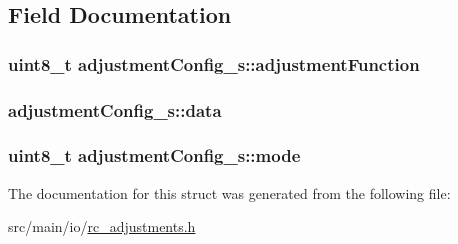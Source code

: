 \subsection{Field Documentation}
\hypertarget{structadjustmentConfig__s_a3ecae146e2ad75635697f33ac069b228}{
\subsubsection[{adjustment\+Function}]{\setlength{\rightskip}{0pt plus 5cm}uint8\+\_\+t adjustment\+Config\+\_\+s\+::adjustment\+Function}}\label{structadjustmentConfig__s_a3ecae146e2ad75635697f33ac069b228}
\hypertarget{structadjustmentConfig__s_a73fc93fee9e72239846c10ed1157889c}{
\subsubsection[{data}]{ adjustment\+Config\+\_\+s\+::data}}\label{structadjustmentConfig__s_a73fc93fee9e72239846c10ed1157889c}
\hypertarget{structadjustmentConfig__s_a8e109c8d93392133cd6ed2846a3c6be8}{
\subsubsection[{mode}]{\setlength{\rightskip}{0pt plus 5cm}uint8\+\_\+t adjustment\+Config\+\_\+s\+::mode}}\label{structadjustmentConfig__s_a8e109c8d93392133cd6ed2846a3c6be8}


The documentation for this struct was generated from the following file\+:\begin{DoxyCompactItemize}
\item 
src/main/io/\hyperlink{io_2rc__adjustments_8h}{rc\+\_\+adjustments.\+h}\end{DoxyCompactItemize}
